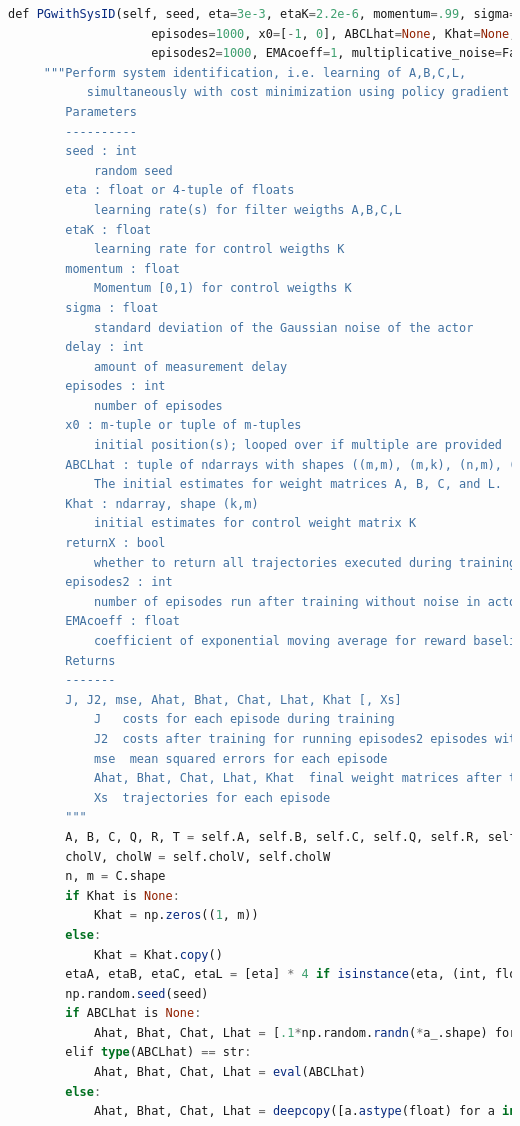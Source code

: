 \begin{lstlisting}[language=julia]
def PGwithSysID(self, seed, eta=3e-3, etaK=2.2e-6, momentum=.99, sigma=.2, delay=1,
                    episodes=1000, x0=[-1, 0], ABCLhat=None, Khat=None, returnX=False,
                    episodes2=1000, EMAcoeff=1, multiplicative_noise=False):
     """Perform system identification, i.e. learning of A,B,C,L,
           simultaneously with cost minimization using policy gradient method GPOMDP
        Parameters
        ----------
        seed : int
            random seed
        eta : float or 4-tuple of floats
            learning rate(s) for filter weigths A,B,C,L
        etaK : float
            learning rate for control weigths K
        momentum : float
            Momentum [0,1) for control weigths K
        sigma : float
            standard deviation of the Gaussian noise of the actor
        delay : int
            amount of measurement delay
        episodes : int
            number of episodes
        x0 : m-tuple or tuple of m-tuples
            initial position(s); looped over if multiple are provided
        ABCLhat : tuple of ndarrays with shapes ((m,m), (m,k), (n,m), (m,n))
            The initial estimates for weight matrices A, B, C, and L.
        Khat : ndarray, shape (k,m)
            initial estimates for control weight matrix K
        returnX : bool
            whether to return all trajectories executed during training
        episodes2 : int
            number of episodes run after training without noise in actor
        EMAcoeff : float
            coefficient of exponential moving average for reward baseline in PG gradient estimate
        Returns
        -------
        J, J2, mse, Ahat, Bhat, Chat, Lhat, Khat [, Xs]
            J   costs for each episode during training
            J2  costs after training for running episodes2 episodes without noise in actor
            mse  mean squared errors for each episode
            Ahat, Bhat, Chat, Lhat, Khat  final weight matrices after training
            Xs  trajectories for each episode
        """
        A, B, C, Q, R, T = self.A, self.B, self.C, self.Q, self.R, self.T
        cholV, cholW = self.cholV, self.cholW
        n, m = C.shape
        if Khat is None:
            Khat = np.zeros((1, m))
        else:
            Khat = Khat.copy()
        etaA, etaB, etaC, etaL = [eta] * 4 if isinstance(eta, (int, float)) else eta
        np.random.seed(seed)
        if ABCLhat is None:
            Ahat, Bhat, Chat, Lhat = [.1*np.random.randn(*a_.shape) for a_ in (A, B, C, C.T)]
        elif type(ABCLhat) == str:
            Ahat, Bhat, Chat, Lhat = eval(ABCLhat)
        else:
            Ahat, Bhat, Chat, Lhat = deepcopy([a.astype(float) for a in ABCLhat])

\end{lstlisting}
